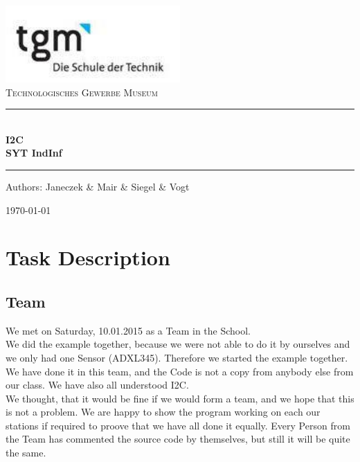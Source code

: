 \documentclass[12pt]{article}
\begin{document}
\begin{titlepage}
\begin{center}
\includegraphics[width=0.5\textwidth]{images/logo}\\[1cm]    

\textsc{\LARGE Technologisches Gewerbe Museum}\\[1.5cm]

\rule{12cm}{1mm}
{ \huge \bfseries  \\ \huge I2C \\ \large SYT IndInf\\[0.4cm] }

\rule{12cm}{1mm}

\noindent 
\vspace{5cm}

\begin{center}
\large
Authors: 
Janeczek  \&
Mair \&
Siegel  \&
Vogt 
\end{center}

\vfill

{\large \today}

\end{center}
\end{titlepage}

\tableofcontents


\ohead{\headmark}

\newpage


\section{Task Description}
\subsection{Team}
We met on Saturday, 10.01.2015 as a Team in the School. \\
We did the example together, because we were not able to do it by ourselves and we only had one Sensor (ADXL345).
Therefore we started the example together. We have done it in this team, and the Code is not a copy from anybody else from our class. We have also all understood I2C. \\
We thought, that it would be fine if we would form a team, and we hope that this is not a problem. We are happy to show the program working on each our stations if required to proove that we have all done it equally.
Every Person from the Team has commented the source code by themselves, but still it will be quite the same.
\end{document}

